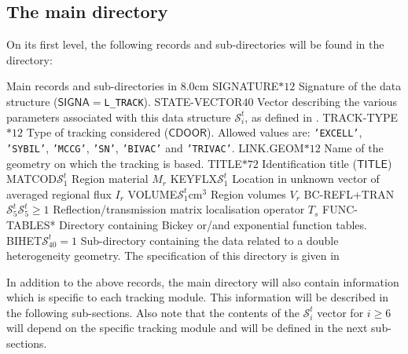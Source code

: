 \subsection{The main  directory}\label{sect:trackingdirmain}

On its first level, the
following records and sub-directories will be found in the  directory:

\begin{DescriptionEnregistrement}{Main records and sub-directories in }{8.0cm}
\CharEnr
  {SIGNATURE}{$*12$}
  {Signature of the data structure ($\mathsf{SIGNA}=${\tt L\_TRACK}).}
\IntEnr
  {STATE-VECTOR}{$40$}
  {Vector describing the various parameters associated with this data structure $\mathcal{S}^{t}_{i}$,
  as defined in .}
\CharEnr
  {TRACK-TYPE}{$*12$}
  {Type of tracking considered ($\mathsf{CDOOR}$). Allowed values are:
  {\tt 'EXCELL'}, {\tt 'SYBIL'}, {\tt 'MCCG'}, {\tt 'SN'}, {\tt 'BIVAC'} and {\tt 'TRIVAC'}.}
\CharEnr
  {LINK.GEOM}{$*12$}
  {Name of the {\sc geometry} on which the tracking is based.}
\CharEnr
  {TITLE}{$*72$}
  {Identification title ($\mathsf{TITLE}$) }
\IntEnr
  {MATCOD}{$\mathcal{S}^{t}_{1}$}
  {Region material $M_{r}$}
\IntEnr
  {KEYFLX}{$\mathcal{S}^{t}_{1}$}
  {Location in unknown vector of averaged regional flux $I_{r}$}
\RealEnr
  {VOLUME}{$\mathcal{S}^{t}_{1}$}{cm$^{3}$}
  {Region volumes $V_{r}$}
\OptIntEnr
  {BC-REFL+TRAN}{$\mathcal{S}^{t}_{5}$}{$\mathcal{S}^{t}_{5}\ge 1$}
  {Reflection/transmission matrix localisation operator $T_{s}$}
\OptDirEnr
  {FUNC-TABLES}{*}
  {Directory containing Bickey or/and exponential function tables.} 
\OptDirEnr
  {BIHET}{$\mathcal{S}^{t}_{40}=1$}
  {Sub-directory containing the data related to a double heterogeneity geometry.
  The specification of this directory is given in } 
\end{DescriptionEnregistrement}

In addition to the above records, the main  directory will also contain information
which is specific to each tracking module. This information will be described in the following
sub-sections. Also note that the contents of the $\mathcal{S}^{t}_{i}$ vector for $i\ge 6$ will depend
on the specific tracking module and will be defined in the next sub-sections.

